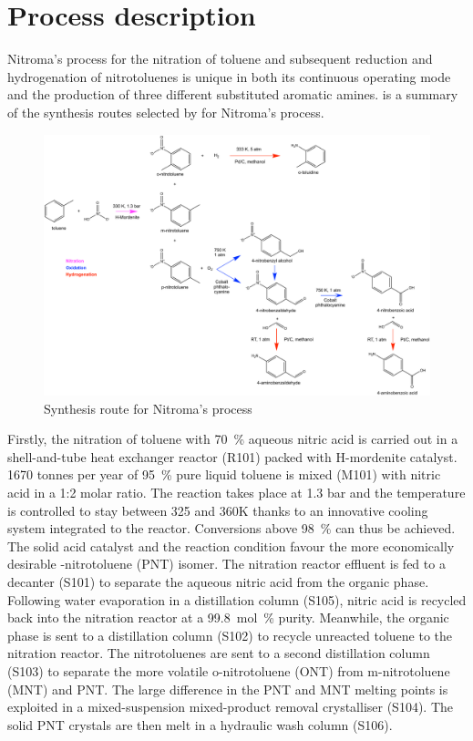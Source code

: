 \section{Process description}

Nitroma's process for the nitration of toluene and subsequent reduction and hydrogenation of nitrotoluenes is unique in both its continuous operating mode and the production of three different substituted aromatic amines.   is a summary of the synthesis routes selected by for Nitroma's process.
\begin{figure}[H]
    \centering
    \includegraphics[width=0.8\linewidth]{chapters/2-reaction/figures/routes-chosen.pdf}
    \caption{Synthesis route for Nitroma's process}
    \label{fig:routes-SI}
\end{figure}

Firstly, the nitration of toluene with \SI{70}{\percent} aqueous nitric acid is carried out in a shell-and-tube heat exchanger reactor (R101) packed with H-mordenite catalyst. 1670 tonnes per year of \SI{95}{\percent} pure liquid toluene is mixed (M101) with nitric acid in a 1:2 molar ratio. The reaction takes place at 1.3 bar and the temperature is controlled to stay between 325 and 360K thanks to an innovative cooling system integrated to the reactor. Conversions above \SI{98}{\percent} can thus be achieved. The solid acid catalyst and the reaction condition favour the more economically desirable \para-nitrotoluene (PNT) isomer. The nitration reactor effluent is fed to a decanter (S101) to separate the aqueous nitric acid from the organic phase. Following water evaporation in a distillation column (S105), nitric acid is recycled back into the nitration reactor at a \SI{99.8}{mol\percent} purity.  Meanwhile, the organic phase is sent to a distillation column (S102) to recycle unreacted toluene to the nitration reactor. The nitrotoluenes are sent to a second distillation column (S103) to separate the more volatile o-nitrotoluene (ONT) from m-nitrotoluene (MNT) and PNT. The large difference in the PNT and MNT melting points is exploited in a mixed-suspension mixed-product removal crystalliser (S104). The solid PNT crystals are then melt in a hydraulic wash column (S106).

